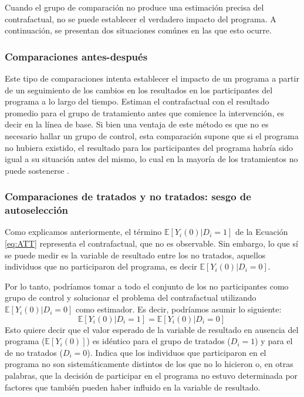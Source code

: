 \documentclass[../../main.tex]{subfiles}
\begin{document}
Cuando el grupo de comparación no produce una estimación precisa del contrafactual, no se
puede establecer el verdadero impacto del programa. A continuación, se presentan dos
situaciones comúnes en las que esto ocurre.

\subsubsection{Comparaciones antes-después}
Este tipo de comparaciones intenta establecer el impacto de un programa a partir de un
seguimiento de los cambios en los resultados en los participantes del programa a lo largo
del tiempo. Estiman el contrafactual con el resultado promedio para el grupo de
tratamiento antes que comience la intervención, es decir en la línea de base. Si bien una
ventaja de este método es que no es necesario hallar un grupo de control, esta comparación
supone que si el programa no hubiera existido, el resultado para los participantes del
programa habría sido igual a su situación antes del mismo, lo cual en la mayoría de los
tratamientos no puede sostenerse \cite{gertler-2016}.

\subsubsection{Comparaciones de tratados y no tratados: sesgo de autoselección}
Como explicamos anteriormente, el término \(\mathbb{E} \left[Y_i(0)|D_i=1\right]\) de la
Ecuación \ref{eq:ATT} representa el contrafactual, que no es observable. Sin embargo, lo
que sí se puede medir es la variable de resultado entre los no tratados, aquellos
individuos que no participaron del programa, es decir \(\mathbb{E}
\left[Y_i(0)|D_i=0\right]\).

Por lo tanto, podríamos tomar a todo el conjunto de los no participantes como grupo de
control y solucionar el problema del contrafactual utilizando \(\mathbb{E}
\left[Y_i(0)|D_i=0\right]\) como estimador. Es decir, podríamos asumir lo siguiente:
\begin{equation}
    \mathbb{E} \left[Y_i(0)|D_i=1\right] = \mathbb{E} \left[Y_i(0)|D_i=0\right]\
    \label{eq:supuesto-1}  %
\end{equation}
Esto quiere decir que el valor esperado de la variable de resultado en ausencia del
programa (\(\mathbb{E}\left[Y_i(0)\right]\)) es idéntico para el grupo de tratados (\(D_i =
1\)) y para el de no tratados (\(D_i = 0\)). Indica que los individuos que participaron en el
programa no son sistemáticamente distintos de los que no lo hicieron \cite{bernal} o, en
otras palabras, que la decisión de participar en el programa no estuvo determinada por
factores que también pueden haber influido en la variable de resultado.
\end{document}
